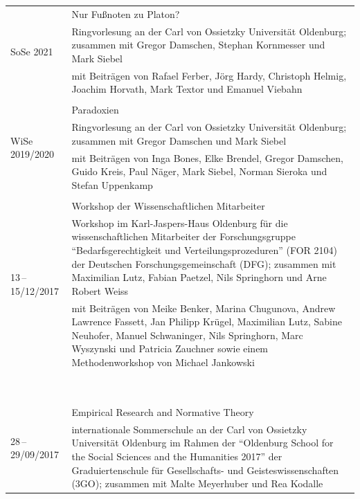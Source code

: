 \documentclass[a4paper,10pt]{article}
\begin{document}
\begin{longtable}{p{2.5cm}p{11cm}}
\\
\multirow{3}{2.5cm}{\footnotesize{SoSe 2021}} & Nur Fußnoten zu Platon?\\
& \footnotesize{Ringvorlesung an der Carl von Ossietzky Universität Oldenburg; zusammen mit Gregor Damschen, Stephan Kornmesser und Mark Siebel}\\
& \footnotesize{mit Beiträgen von Rafael Ferber, Jörg Hardy, Christoph Helmig, Joachim Horvath, Mark Textor und Emanuel Viebahn}\\
\\
\multirow{3}{2.5cm}{\footnotesize{WiSe 2019/2020}} & Paradoxien\\
& \footnotesize{Ringvorlesung an der Carl von Ossietzky Universität Oldenburg; zusammen mit Gregor Damschen und Mark Siebel}\\
& \footnotesize{mit Beiträgen von Inga Bones, Elke Brendel, Gregor Damschen, Guido Kreis, Paul Näger, Mark Siebel, Norman Sieroka und Stefan Uppenkamp}\\
\\
\multirow{3}{2.5cm}{\footnotesize{13\,--\,15/12/2017}} & Workshop der Wissenschaftlichen Mitarbeiter\\
& \footnotesize{Workshop im Karl-Jaspers-Haus Oldenburg für die wissenschaftlichen Mitarbeiter der Forschungsgruppe \enquote{Bedarfsgerechtigkeit und Verteilungsprozeduren} (FOR 2104) der Deutschen Forschungsgemeinschaft (DFG); zusammen mit Maximilian Lutz, Fabian Paetzel, Nils Springhorn und Arne Robert Weiss}\\
& \footnotesize{mit Beiträgen von Meike Benker, Marina Chugunova, Andrew Lawrence Fassett, Jan Philipp Krügel, Maximilian Lutz, Sabine Neuhofer, Manuel Schwaninger, Nils Springhorn, Marc Wyszynski und Patricia Zauchner sowie einem Methodenworkshop von Michael Jankowski}\\
\\
\\ %
\\ %
\\ %
\\ %
\\ %
\\ %
\\ %
\\ %
\multirow{3}{2.5cm}{\footnotesize{28\,--\,29/09/2017}} & Empirical Research and Normative Theory\\
& \footnotesize{internationale Sommerschule an der Carl von Ossietzky Universität Oldenburg im Rahmen der \enquote{Oldenburg School for the Social Sciences and the Humanities 2017} der Graduiertenschule für Gesellschafts- und Geisteswissenschaften (3GO); zusammen mit Malte Meyerhuber und Rea Kodalle}\\

\end{longtable}
\end{document}
